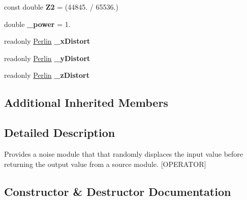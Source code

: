 \begin{DoxyCompactItemize}
const double {\bfseries Z2} = (44845. / 65536.)
\item 
\mbox{\label{class_lib_noise_1_1_operator_1_1_turbulence_a6ba61fdf254964ab9466938bebdb5673}} 
double {\bfseries \+\_\+power} = 1.
\item 
\mbox{\label{class_lib_noise_1_1_operator_1_1_turbulence_a02810e30fb8dd6368660e03d776b7674}} 
readonly \hyperlink{class_lib_noise_1_1_generator_1_1_perlin}{Perlin} {\bfseries \+\_\+x\+Distort}
\item 
\mbox{\label{class_lib_noise_1_1_operator_1_1_turbulence_a72d4d860b4edcef6d3f567d5da2e444c}} 
readonly \hyperlink{class_lib_noise_1_1_generator_1_1_perlin}{Perlin} {\bfseries \+\_\+y\+Distort}
\item 
\mbox{\label{class_lib_noise_1_1_operator_1_1_turbulence_a2ffd66269579d7ffa37e9e635e44a682}} 
readonly \hyperlink{class_lib_noise_1_1_generator_1_1_perlin}{Perlin} {\bfseries \+\_\+z\+Distort}
\end{DoxyCompactItemize}
\subsection*{Additional Inherited Members}


\subsection{Detailed Description}
Provides a noise module that that randomly displaces the input value before returning the output value from a source module. \mbox{[}O\+P\+E\+R\+A\+T\+OR\mbox{]} 



\subsection{Constructor \& Destructor Documentation}
\mbox{\label{class_lib_noise_1_1_operator_1_1_turbulence_a6e3b317e7a5db21ab409ec76c9100e88}} 
